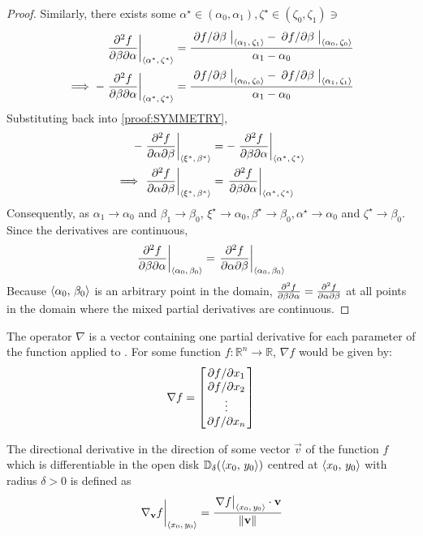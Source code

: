 \begin{lemma}
\begin{proof}
		Similarly, there exists some $\alpha^\star\in(\alpha_0,\alpha_1),\zeta^\star\in(\zeta_0,\zeta_1)\ni$
		\begin{align*}
			\eval{\pdv{f}{\beta}{\alpha}}_{\point{\alpha^\star}{\zeta^\star}}&=\frac{\eval{\pdv*{f}{\beta}}_{\point{\alpha_1}{\zeta_1}}-\eval{\pdv*{f}{\beta}}_{\point{\alpha_0}{\zeta_0}}}{\alpha_1-\alpha_0}\\
			\implies-\eval{\pdv{f}{\beta}{\alpha}}_{\point{\alpha^\star}{\zeta^\star}}&=\frac{\eval{\pdv*{f}{\beta}}_{\point{\alpha_0}{\zeta_0}}-\eval{\pdv*{f}{\beta}}_{\point{\alpha_1}{\zeta_1}}}{\alpha_1-\alpha_0}
		\end{align*}
		Substituting back into \eqref{proof:SYMMETRY},
		\begin{align*}
			-\eval{\pdv{f}{\alpha}{\beta}}_{\point{\xi^\star}{\beta^\star}}&=-\eval{\pdv{f}{\beta}{\alpha}}_{\point{\alpha^\star}{\zeta^\star}}\\
			\implies\eval{\pdv{f}{\alpha}{\beta}}_{\point{\xi^\star}{\beta^\star}}&=\eval{\pdv{f}{\beta}{\alpha}}_{\point{\alpha^\star}{\zeta^\star}}
		\end{align*}
		Consequently, as $\alpha_1\rightarrow\alpha_0$ and $\beta_1\rightarrow\beta_0$, $\xi^\star\rightarrow\alpha_0,\beta^\star\rightarrow\beta_0,\alpha^\star\rightarrow\alpha_0$ 
		and $\zeta^\star\rightarrow\beta_0$. Since the derivatives are continuous,
		$$
			\eval{\pdv{f}{\beta}{\alpha}}_{\point{\alpha_0}{\beta_0}}=\eval{\pdv{f}{\alpha}{\beta}}_{\point{\alpha_0}{\beta_0}}
		$$
		Because $\langle\alpha_0,\,\beta_0\rangle$ is an arbitrary point in the domain, $\pdv{f}{\beta}{\alpha}=\pdv{f}{\alpha}{\beta}$ at 
		all points in the domain where the mixed partial derivatives are continuous.
	\end{proof}
\end{lemma}
\begin{defn}
	The  operator $\nabla$ is a vector containing one partial derivative for each parameter of
	the function applied to \cite{RAPP2017137}. For some function $f:\mathbb{R}^n\rightarrow\mathbb{R}$, $\nabla f$ would be given by:
	$$
	\nabla f=\begin{bmatrix}
		\pdv*{f}{x_1}\\
		\pdv*{f}{x_2}\\
		\vdots\\
		\pdv*{f}{x_n}
	\end{bmatrix}
	$$
\end{defn}
\begin{defn}
	The directional derivative in the direction of some vector $\vec{v}$ of the function $f$ which is differentiable in
	the open disk $\mathbb{D}_\delta(\langle x_0,\,y_0\rangle)$ centred at $\langle x_0,\,y_0\rangle$ with radius $\delta>0$ is defined as
	$$
		\eval{\nabla_{\vec{v}}f}_{\point{x_0}{y_0}}=\frac{\eval{\nabla f}_{\point{x_0}{y_0}}\cdot\vec{v}}{\lVert\vec{v}\rVert}
	$$
\end{defn}